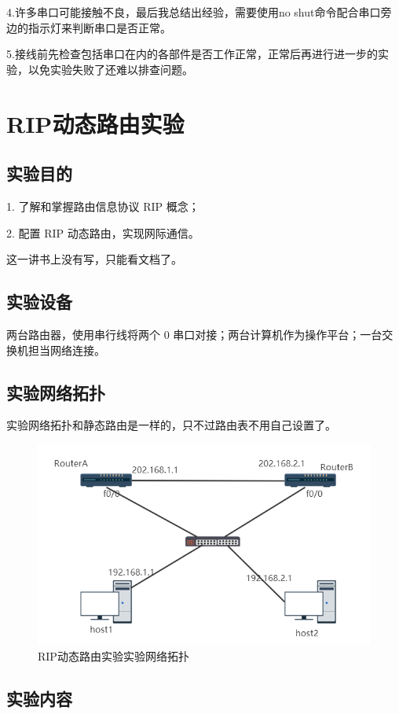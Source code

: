 \documentclass[lang=cn,11pt,a4paper,cite=authoryear]{elegantpaper}
\begin{document}
4.许多串口可能接触不良，最后我总结出经验，需要使用no shut命令配合串口旁边的指示灯来判断串口是否正常。

5.接线前先检查包括串口在内的各部件是否工作正常，正常后再进行进一步的实验，以免实验失败了还难以排查问题。

\section{RIP动态路由实验}
\subsection{实验目的}

1.	了解和掌握路由信息协议 RIP 概念；

2.	配置 RIP 动态路由，实现网际通信。

这一讲书上没有写，只能看文档了。

\subsection{实验设备}

两台路由器，使用串行线将两个 0 串口对接；两台计算机作为操作平台；一台交换机担当网络连接。

\subsection{实验网络拓扑}
实验网络拓扑和静态路由是一样的，只不过路由表不用自己设置了。

\begin{figure}[htbp]
	\centering
	\includegraphics[width=0.7\linewidth]{image/screenshot024}
	\caption{RIP动态路由实验实验网络拓扑}
	\label{fig:screenshot024-2}
\end{figure}

\subsection{实验内容}
\end{document}
